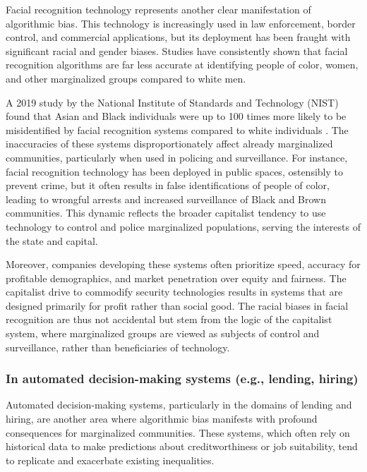 \begin{refsection}
Facial recognition technology represents another clear manifestation of algorithmic bias. This technology is increasingly used in law enforcement, border control, and commercial applications, but its deployment has been fraught with significant racial and gender biases. Studies have consistently shown that facial recognition algorithms are far less accurate at identifying people of color, women, and other marginalized groups compared to white men.

A 2019 study by the National Institute of Standards and Technology (NIST) found that Asian and Black individuals were up to 100 times more likely to be misidentified by facial recognition systems compared to white individuals \cite[pp.~43-45]{grother2019}. The inaccuracies of these systems disproportionately affect already marginalized communities, particularly when used in policing and surveillance. For instance, facial recognition technology has been deployed in public spaces, ostensibly to prevent crime, but it often results in false identifications of people of color, leading to wrongful arrests and increased surveillance of Black and Brown communities. This dynamic reflects the broader capitalist tendency to use technology to control and police marginalized populations, serving the interests of the state and capital.

Moreover, companies developing these systems often prioritize speed, accuracy for profitable demographics, and market penetration over equity and fairness. The capitalist drive to commodify security technologies results in systems that are designed primarily for profit rather than social good. The racial biases in facial recognition are thus not accidental but stem from the logic of the capitalist system, where marginalized groups are viewed as subjects of control and surveillance, rather than beneficiaries of technology.

\subsubsection{In automated decision-making systems (e.g., lending, hiring)}

Automated decision-making systems, particularly in the domains of lending and hiring, are another area where algorithmic bias manifests with profound consequences for marginalized communities. These systems, which often rely on historical data to make predictions about creditworthiness or job suitability, tend to replicate and exacerbate existing inequalities.


\end{refsection}
